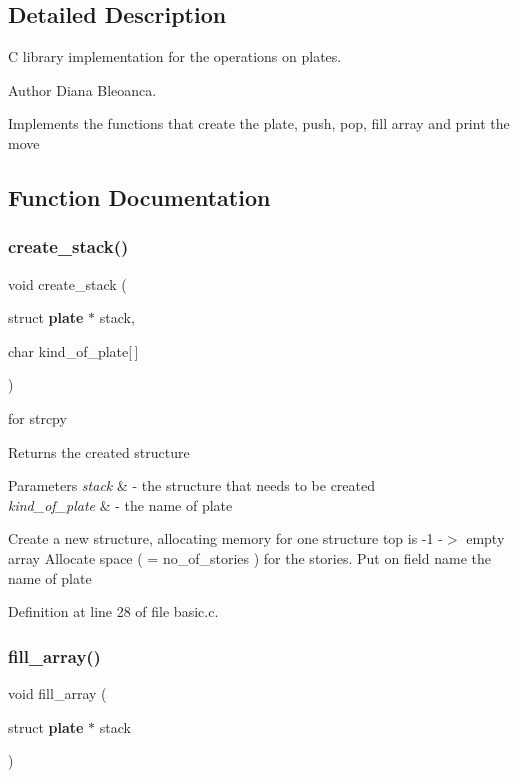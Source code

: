\subsection{Detailed Description}
C library implementation for the operations on plates. 

\begin{DoxyAuthor}{Author}
Diana Bleoanca.
\end{DoxyAuthor}
Implements the functions that create the plate, push, pop, fill array and print the move 

\subsection{Function Documentation}
\mbox{\label{basic_8c_a1d0a0830bf5cb78cb4382a57a49284d1}} 
\subsubsection{create\+\_\+stack()}
{\footnotesize\ttfamily void create\+\_\+stack (\begin{DoxyParamCaption}\item[{struct \textbf{ plate} $\ast$}]{stack,  }\item[{char}]{kind\+\_\+of\+\_\+plate[$\,$] }\end{DoxyParamCaption})}



for strcpy 

Returns the created structure 
\begin{DoxyParams}{Parameters}
{\em stack} & -\/ the structure that needs to be created \\
\hline
{\em kind\+\_\+of\+\_\+plate} & -\/ the name of plate\\
\hline
\end{DoxyParams}
Create a new structure, allocating memory for one structure top is -\/1 -\/$>$ empty array Allocate space ( = no\+\_\+of\+\_\+stories ) for the stories. Put on field name the name of plate 

Definition at line 28 of file basic.\+c.

\mbox{\label{basic_8c_a53a6f99647676f5329c68f2cbfdb6274}} 
\subsubsection{fill\+\_\+array()}
{\footnotesize\ttfamily void fill\+\_\+array (\begin{DoxyParamCaption}\item[{struct \textbf{ plate} $\ast$}]{stack }\end{DoxyParamCaption})}



